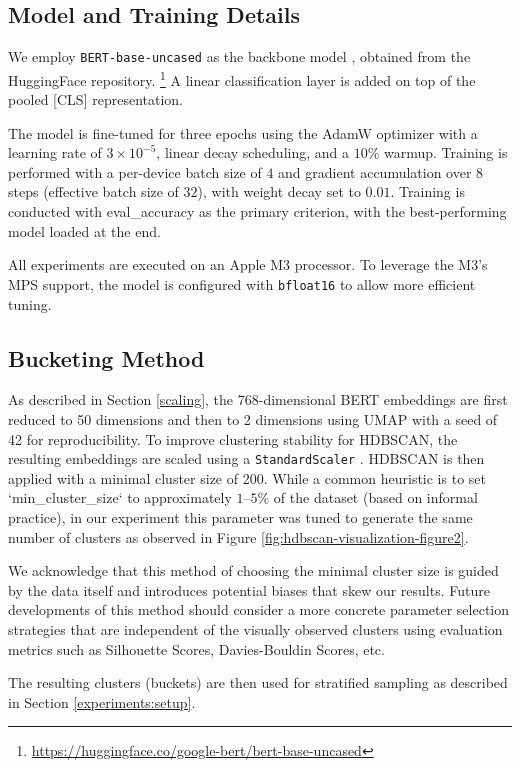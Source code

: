 \documentclass[twocolumn]{article}
\newcounter{ex}
\renewcommand{\indent}{\hspace*{2em}}
\begin{document}
\subsection{Model and Training Details}\label{experiments:model}
\indent We employ \texttt{BERT-base-uncased} as the backbone model \cite{devlin2019bert}, obtained from the HuggingFace repository. \footnote{\url{https://huggingface.co/google-bert/bert-base-uncased}} A linear classification layer is added on top of the pooled [CLS] representation. 

\indent The model is fine-tuned for three epochs using the AdamW optimizer with a learning rate of $3\times10^{-5}$, linear decay scheduling, and a $10\%$ warmup. Training is performed with a per-device batch size of $4$ and gradient accumulation over $8$ steps (effective batch size of $32$), with weight decay set to $0.01$. 
Training is conducted with eval\_accuracy as the primary criterion, with the best-performing model loaded at the end.

\indent All experiments are executed on an Apple M3 processor. To leverage the M3's MPS support, the model is configured with \texttt{bfloat16} to allow more efficient tuning.
\subsection{Bucketing Method}\label{experiments:bucketing}
As described in Section \ref{scaling}, the 768-dimensional BERT embeddings are first reduced to 50 dimensions and then to 2 dimensions using UMAP with a seed of 42 for reproducibility. To improve clustering stability for HDBSCAN, the resulting embeddings are scaled using a \texttt{StandardScaler} \cite{wongoutong2024feature}. HDBSCAN is then applied with a minimal cluster size of 200. While a common heuristic is to set `min\_cluster\_size` to approximately $1–5\%$ of the dataset (based on informal practice), in our experiment this parameter was tuned to generate the same number of clusters as observed in Figure \ref{fig:hdbscan-visualization-figure2}. 

\indent We acknowledge that this method of choosing the minimal cluster size is guided by the data itself and introduces potential biases that skew our results. Future developments of this method should consider a more concrete parameter selection strategies that are independent of the visually observed clusters using evaluation metrics such as Silhouette Scores, Davies-Bouldin Scores, etc.

The resulting clusters (buckets) are then used for stratified sampling as described in Section \ref{experiments:setup}.
\end{document}
